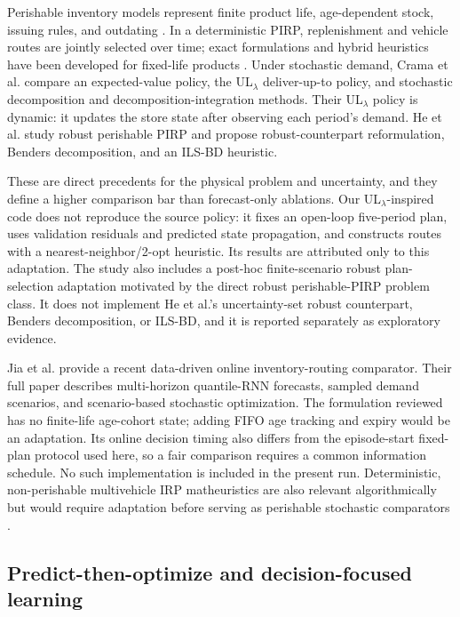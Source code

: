 \documentclass[11pt,a4paper]{article}
\begin{document}
Perishable inventory models represent finite product life, age-dependent stock, issuing rules, and outdating \citep{nahmias1982perishable,haijema2014new}. In a deterministic PIRP, replenishment and vehicle routes are jointly selected over time; exact formulations and hybrid heuristics have been developed for fixed-life products \citep{coelho2014optimal,alvarez2020formulations}. Under stochastic demand, Crama et al. \citep{crama2018stochastic} compare an expected-value policy, the UL$_\lambda$ deliver-up-to policy, and stochastic decomposition and decomposition-integration methods. Their UL$_\lambda$ policy is dynamic: it updates the store state after observing each period's demand. He et al. \citep{he2024robust} study robust perishable PIRP and propose robust-counterpart reformulation, Benders decomposition, and an ILS-BD heuristic.

These are direct precedents for the physical problem and uncertainty, and they define a higher comparison bar than forecast-only ablations. Our UL$_\lambda$-inspired code does not reproduce the source policy: it fixes an open-loop five-period plan, uses validation residuals and predicted state propagation, and constructs routes with a nearest-neighbor/2-opt heuristic. Its results are attributed only to this adaptation. The study also includes a post-hoc finite-scenario robust plan-selection adaptation motivated by the direct robust perishable-PIRP problem class. It does not implement He et al.'s uncertainty-set robust counterpart, Benders decomposition, or ILS-BD, and it is reported separately as exploratory evidence.

Jia et al. \citep{jia2025scenario} provide a recent data-driven online inventory-routing comparator. Their full paper describes multi-horizon quantile-RNN forecasts, sampled demand scenarios, and scenario-based stochastic optimization. The formulation reviewed has no finite-life age-cohort state; adding FIFO age tracking and expiry would be an adaptation. Its online decision timing also differs from the episode-start fixed-plan protocol used here, so a fair comparison requires a common information schedule. No such implementation is included in the present run. Deterministic, non-perishable multivehicle IRP matheuristics are also relevant algorithmically but would require adaptation before serving as perishable stochastic comparators \citep{lagana2024ils}.

\subsection{Predict-then-optimize and decision-focused learning}
\end{document}
